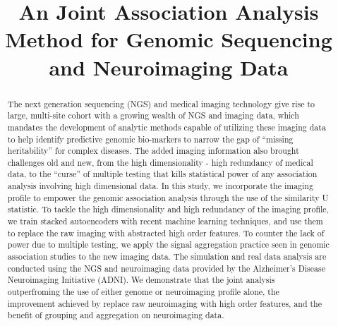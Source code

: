 \documentclass[11pt]{article}
\begin{document}
\title{An Joint Association Analysis Method for Genomic Sequencing and Neuroimaging Data}
\maketitle
{}

\clearpage
\begin{abstract}
The next generation sequencing (NGS) and medical imaging technology give rise to large, multi-site cohort with a growing wealth of NGS and imaging data, which mandates the development of analytic methods capable of utilizing these imaging data to help identify predictive genomic bio-markers to narrow the gap of ``missing heritability'' for complex diseases. The added imaging information also brought challenges old and new, from the high dimensionality - high redundancy of medical data, to the ``curse'' of multiple testing that kills statistical power of any association analysis involving high dimensional data. In this study, we incorporate the imaging profile to empower the genomic association analysis through the use of the similarity U statistic. To tackle the high dimensionality and high redundancy of the imaging profile, we train stacked autoencoders with recent machine learning techniques, and use them to replace the raw imaging with abstracted high order features. To counter the lack of power due to multiple testing, we apply the signal aggregation practice seen in genomic association studies to the new imaging data.
The simulation and real data analysis are conducted using the NGS and neuroimaging data provided by the Alzheimer’s Disease Neuroimaging Initiative (ADNI). We demonstrate that the joint analysis outperfroming the use of either genome or neuroimaging profile alone, the improvement achieved by replace raw neuroimaging with high order features, and the benefit of grouping and aggregation on neuroimaging data.
\end{abstract}
\clearpage
\end{document}
